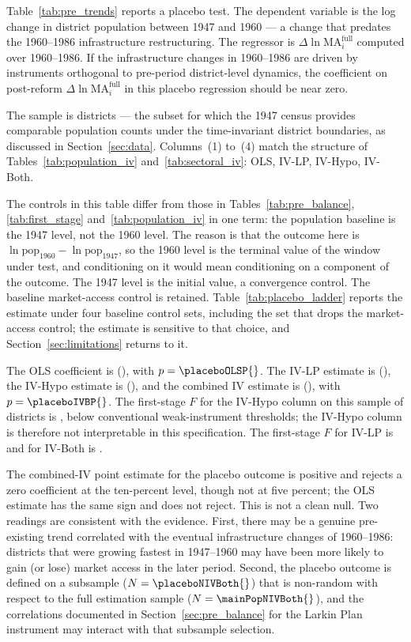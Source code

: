 Table~\ref{tab:pre_trends} reports a placebo test. The dependent
variable is the log change in district population between 1947 and
1960 --- a change that predates the 1960--1986 infrastructure
restructuring. The regressor is $\Delta \ln
\mathrm{MA}^{\mathrm{full}}_i$ computed over 1960--1986. If the
infrastructure changes in 1960--1986 are driven by instruments
orthogonal to pre-period district-level dynamics, the coefficient on
post-reform $\Delta \ln \mathrm{MA}^{\mathrm{full}}_i$ in this
placebo regression should be near zero.

The sample is \placeboNIVBoth{} districts --- the subset for which the 1947 census
provides comparable population counts under the time-invariant
district boundaries, as discussed in Section~\ref{sec:data}. Columns~(1) to~(4)
match the structure of Tables~\ref{tab:population_iv}
and~\ref{tab:sectoral_iv}: OLS, IV-LP, IV-Hypo, IV-Both.

The controls in this table differ from those in
Tables~\ref{tab:pre_balance}, \ref{tab:first_stage}
and~\ref{tab:population_iv} in one term: the population baseline is
the 1947 level, not the 1960 level. The reason is that the outcome
here is $\ln \mathrm{pop}_{1960} - \ln \mathrm{pop}_{1947}$, so the
1960 level is the terminal value of the window under test, and
conditioning on it would mean conditioning on a component of the
outcome. The 1947 level is the initial value, a convergence control.
The baseline market-access control is retained.
Table~\ref{tab:placebo_ladder} reports the estimate under four
baseline control sets, including the set that drops the
market-access control; the estimate is sensitive to that choice, and
Section~\ref{sec:limitations} returns to it.

The OLS coefficient is \placeboOLSCoef{} (\placeboOLSSE{}), with
$p=\placeboOLSP{}$. The IV-LP estimate is \placeboIVLPCoef{} (\placeboIVLPSE{}), the IV-Hypo estimate is
\placeboIVHCoef{} (\placeboIVHSE{}), and the combined IV estimate is \placeboCoefIVBoth{} (\placeboSEIVBoth{}),
with $p=\placeboIVBP{}$. The first-stage $F$ for the
IV-Hypo column on this sample of \placeboNIVBoth{} districts is \placeboFHypo{}, below
conventional weak-instrument thresholds; the IV-Hypo column is
therefore not interpretable in this specification. The first-stage
$F$ for IV-LP is \placeboFLP{} and for IV-Both is \placeboFBoth{}.

The combined-IV point estimate for the placebo outcome is positive
and rejects a zero coefficient at the ten-percent level, though not
at five percent; the OLS estimate has the same sign and does not
reject. This is not a clean null. Two readings are
consistent with the evidence. First, there may be a genuine
pre-existing trend correlated with the eventual infrastructure
changes of 1960--1986: districts that were growing fastest in
1947--1960 may have been more likely to gain (or lose) market access
in the later period. Second, the placebo outcome is defined on a
subsample ($N=\placeboNIVBoth{}$) that is non-random with respect to the full
estimation sample ($N=\mainPopNIVBoth{}$), and the correlations documented in
Section~\ref{sec:pre_balance} for the Larkin Plan instrument may
interact with that subsample selection.

